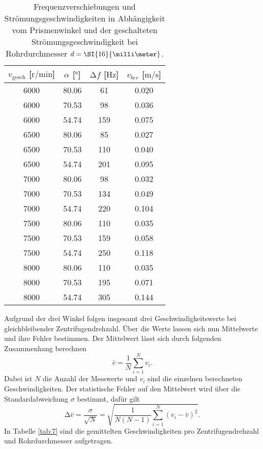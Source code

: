 \begin{table}
    \centering
    \caption{Frequenzverschiebungen und Strömungsgeschwindigkeiten in Abhängigkeit vom Prismenwinkel und der geschalteten Strömungsgeschwindigkeit bei Rohrdurchmesser $\protect d = \SI{16}{\milli\meter}$.}
    \label{tab:6}
    \begin{tabular}{c c c c}
        \toprule
        $v_{\text{gesch}}$ [$\si{{\text{r}}\per\minute}$]  & $\alpha$ [$\si{\degree}$]  & $\increment f$ [$\si{\hertz}$] & $v_{ber}$ [$\si{\meter\per\second}$]\\
        \midrule
        6000    &   80.06    & 61   & 0.020 \\ 
        6000    &   70.53    & 98   & 0.036 \\ 
        6000    &   54.74    & 159  & 0.075 \\ 
        \midrule
        6500    &   80.06   & 85    & 0.027 \\ 
        6500    &   70.53   & 110   & 0.040 \\ 
        6500    &   54.74   & 201   & 0.095 \\ 
        \midrule
        7000    &   80.06   & 98    & 0.032 \\ 
        7000    &   70.53   & 134   & 0.049 \\ 
        7000    &   54.74   & 220   & 0.104 \\ 
        \midrule
        7500    &   80.06   & 110   & 0.035 \\ 
        7500    &   70.53   & 159   & 0.058 \\ 
        7500    &   54.74   & 250   & 0.118 \\ 
        \midrule
        8000    &   80.06   & 110   & 0.035 \\ 
        8000    &   70.53   & 195   & 0.071 \\ 
        8000    &   54.74   & 305   & 0.144 \\ 
        \bottomrule
    \end{tabular}
\end{table}   
\newpage                           
Aufgrund der drei Winkel folgen insgesamt drei Geschwindigkeitswerte bei gleichbleibender Zentrifugendrehzahl. Über die Werte lassen sich nun Mittelwerte und ihre Fehler bestimmen.
Der Mittelwert lässt sich durch folgenden Zusammenhang berechnen
\begin{equation}
    \label{eqn:mittel}
\bar{v} = \frac{1}{N} \sum_{i=1}^{N} v_{i}.
\end{equation}
Dabei ist $N$ die Anzahl der Messwerte und $v_{i}$ sind die einzelnen berechneten Geschwindigkeiten.
Der statistische Fehler auf den Mittelwert wird über die Standardabweichung $\sigma$ bestimmt, dafür gilt
\begin{equation}
    \label{eqn:sem}
\increment \bar{v} = \frac{\sigma}{\sqrt{N}} = \sqrt{\frac{1}{N(N-1)} \sum_{i=1}^{N} (v_{i} - \bar{v})^{2}}.
\end{equation}                                       
In Tabelle \ref{tab:7} sind die gemittelten Geschwindigkeiten pro Zentrifugendrehzahl und Rohrdurchmesser aufgetragen.

